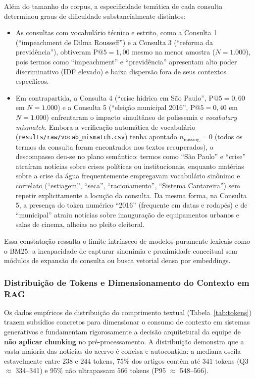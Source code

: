 \documentclass[12pt, a4paper]{article}
\begin{document}
Além do tamanho do corpus, a especificidade temática de cada consulta determinou graus de dificuldade substancialmente distintos:
\begin{itemize}
    \item As consultas com vocabulário técnico e estrito, como a Consulta 1 (``impeachment de Dilma Rousseff'') e a Consulta 3 (``reforma da previdência''), obtiveram $\text{P@5} = 1{,}00$ mesmo na menor amostra ($N=1.000$), pois termos como ``impeachment'' e ``previdência'' apresentam alto poder discriminativo (IDF elevado) e baixa dispersão fora de seus contextos específicos.
    \item Em contrapartida, a Consulta 4 (``crise hídrica em São Paulo'', $\text{P@5} = 0{,}60$ em $N=1.000$) e a Consulta 5 (``eleição municipal 2016'', $\text{P@5} = 0{,}40$ em $N=1.000$) enfrentaram o impacto simultâneo de polissemia e \textit{vocabulary mismatch}. Embora a verificação automática de vocabulário (\texttt{results/raw/vocab\_mismatch.csv}) tenha apontado $n_{\text{missing}} = 0$ (todos os termos da consulta foram encontrados nos textos recuperados), o descompasso deu-se no plano semântico: termos como ``São Paulo'' e ``crise'' atraíram notícias sobre crises políticas ou institucionais, enquanto matérias sobre a crise da água frequentemente empregavam vocabulário sinônimo e correlato (``estiagem'', ``seca'', ``racionamento'', ``Sistema Cantareira'') sem repetir explicitamente a locução da consulta. Da mesma forma, na Consulta 5, a presença do token numérico ``2016'' (frequente em datas e rodapés) e de ``municipal'' atraiu notícias sobre inauguração de equipamentos urbanos e salas de cinema, alheias ao pleito eleitoral.
\end{itemize}

Essa constatação ressalta o limite intrínseco de modelos puramente lexicais como o BM25: a incapacidade de capturar sinonímia e proximidade conceitual sem módulos de expansão de consulta ou busca vetorial densa por embeddings.

\subsubsection{Distribuição de Tokens e Dimensionamento do Contexto em RAG}

Os dados empíricos de distribuição do comprimento textual (Tabela~\ref{tab:tokens}) trazem subsídios concretos para dimensionar o consumo de contexto em sistemas generativos e fundamentam rigorosamente a decisão arquitetural da equipe de \textbf{não aplicar chunking} no pré-processamento. A distribuição demonstra que a vasta maioria das notícias do acervo é concisa e autocontida: a mediana oscila estavelmente entre $238$ e $244$ tokens, 75\% dos artigos contêm até $341$ tokens (Q3 $\approx$ 334--341) e 95\% não ultrapassam $566$ tokens (P95 $\approx$ 548--566).
\end{document}
